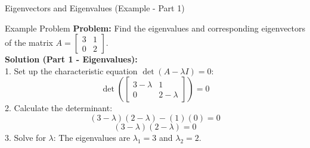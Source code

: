 \documentclass[10pt, aspectratio=169]{beamer}
\begin{document}
\begin{frame}{Eigenvectors and Eigenvalues (Example - Part 1)}
    \begin{exampleblock}{Example Problem}
        \textbf{Problem:} Find the eigenvalues and corresponding eigenvectors of the matrix $A = \begin{bmatrix} 3 & 1 \\ 0 & 2 \end{bmatrix}$. \\
        \vspace{0.2cm}
        \textbf{Solution (Part 1 - Eigenvalues):} \\
        1. Set up the characteristic equation $\det(A - \lambda I) = 0$:
        $$\det\left( \begin{bmatrix} 3-\lambda & 1 \\ 0 & 2-\lambda \end{bmatrix} \right) = 0$$
        2. Calculate the determinant:
        $$(3-\lambda)(2-\lambda) - (1)(0) = 0$$
        $$(3-\lambda)(2-\lambda) = 0$$
        3. Solve for $\lambda$: The eigenvalues are $\lambda_1 = 3$ and $\lambda_2 = 2$.
    \end{exampleblock}
\end{frame}
\end{document}
